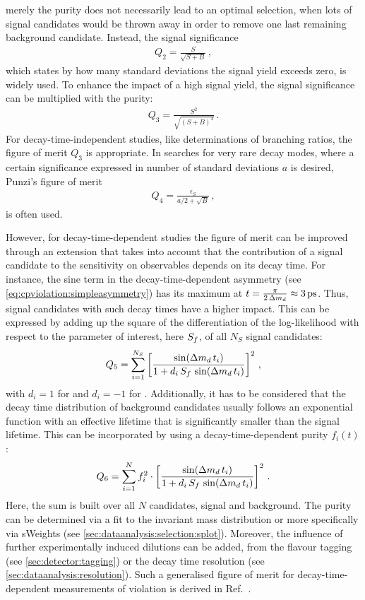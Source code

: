 merely the purity does not necessarily lead to an optimal selection, \eg when
lots of signal candidates would be thrown away in order to remove one last
remaining background candidate. Instead, the signal significance
\begin{align}
	Q_2 = \frac{S}{\sqrt{S + B}}\,,
\end{align}
which states by how many standard deviations the signal yield exceeds zero, is
widely used. To enhance the impact of a high signal yield, the signal
significance can be multiplied with the purity:
\begin{align}
	Q_3 = \frac{S^2}{\sqrt{(S + B)^3}}\,.
\end{align}
For decay-time-independent studies, like determinations of branching ratios,
the figure of merit $Q_3$ is appropriate. In searches for very rare decay
modes, where a certain significance expressed in number of standard deviations
$a$ is desired, Punzi's figure of merit~\cite{Punzi:2003bu}
\begin{align}
	Q_4 = \frac{\epsilon_S}{a/2 + \sqrt{B}}\,,
\end{align}
is often used.

However, for decay-time-dependent studies the figure of merit can be improved
through an extension that takes into account that the contribution of a signal
candidate to the sensitivity on \CP observables depends on its decay time. For
instance, the sine term in the decay-time-dependent asymmetry (see
\cref{eq:cpviolation:simpleasymmetry}) has its maximum at $t =
\frac{\pi}{2\,\dmd} \approx \SI{3}{\ps}$. Thus, signal candidates with such
decay times have a higher impact. This can be expressed by adding up the
square of the differentiation of the log-likelihood with respect to the
parameter of interest, here $S_{f}$, of all $N_S$ signal candidates:
\begin{align}
	Q_5 = \sum_{i=1}^{N_S} \left[\frac{\sin({\Delta m_{{d}}}\,t_i)}{1 + d_i\,S_f\,\sin({\Delta m_{{d}}}\,t_i)}\right]^2\,,
\end{align}
with $d_i = \num{+1}$ for \Bd and $d_i = \num{-1}$ for \Bdb. Additionally, it
has to be considered that the decay time distribution of background candidates
usually follows an exponential function with an effective lifetime that is
significantly smaller than the \Bd signal lifetime. This can be incorporated
by using a decay-time-dependent purity $f_i(t)$:
\begin{align}
	Q_6 = \sum_{i=1}^{N} f_i^2 \cdot \left[\frac{\sin({\Delta m_{{d}}}\,t_i)}{1 + d_i\,S_f\,\sin({\Delta m_{{d}}}\,t_i)}\right]^2\,.
\end{align}
Here, the sum is built over all $N$ candidates, signal and background. The
purity can be determined via a fit to the invariant mass distribution or more
specifically via sWeights (see \cref{sec:dataanalysis:selection:splot}).
Moreover, the influence of further experimentally induced dilutions can be
added, \eg from the flavour tagging (see \cref{sec:detector:tagging})
or the decay time resolution (see \cref{sec:dataanalysis:resolution}). Such a
generalised figure of merit for decay-time-dependent measurements of
\CP violation is derived in Ref.~\cite{FOM}.